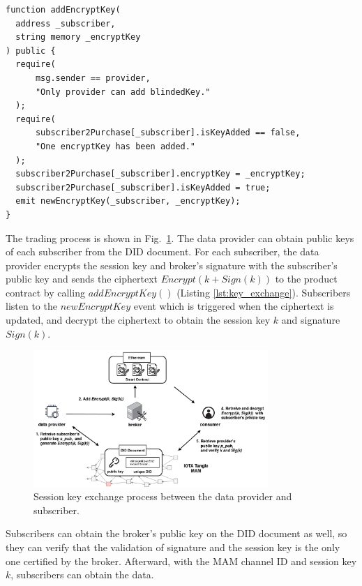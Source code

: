 \documentclass[conference]{IEEEtran}
\begin{document}
\lstset{style=solidity}

\begin{lstlisting}[caption={Update encryption key}, label={lst:key_exchange}, frame=single]
function addEncryptKey(
  address _subscriber,
  string memory _encryptKey
) public {
  require(
      msg.sender == provider,
      "Only provider can add blindedKey."
  );
  require(
      subscriber2Purchase[_subscriber].isKeyAdded == false,
      "One encryptKey has been added."
  );
  subscriber2Purchase[_subscriber].encryptKey = _encryptKey;
  subscriber2Purchase[_subscriber].isKeyAdded = true;
  emit newEncryptKey(_subscriber, _encryptKey);
}
\end{lstlisting}

The trading process is shown in Fig.~\ref{fig:key_exchange}. The data provider can obtain public keys of each subscriber from the DID document. For each subscriber, the data provider encrypts the session key and broker's signature with the subscriber's public key and sends the ciphertext $Encrypt(k + Sign(k))$ to the product contract by calling $addEncryptKey()$ (Listing \ref{lst:key_exchange}). Subscribers listen to the $newEncryptKey$ event which is triggered when the ciphertext is updated, and decrypt the ciphertext to obtain the session key $k$ and signature $Sign(k)$.

\begin{figure}[!t]
    \centering
    \includegraphics[width=3.5in]{key_exchange}
    \caption{Session key exchange process between the data provider and subscriber.}
    \label{fig:key_exchange}
\end{figure}

Subscribers can obtain the broker's public key on the DID document as well, so they can verify that the validation of signature and the session key is the only one certified by the broker. Afterward, with the MAM channel ID and session key $k$, subscribers can obtain the data.
\end{document}
